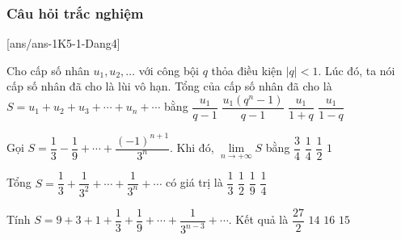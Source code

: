 \subsubsection{Câu hỏi trắc nghiệm}
[ans/ans-1K5-1-Dang4]
\begin{ex}%
	Cho cấp số nhân $u_1,u_2,\ldots$ với công bội $q$ thỏa điều kiện $|q|<1$. Lúc đó, ta nói cấp số nhân đã cho là lùi vô hạn. Tổng của cấp số nhân đã cho là $S=u_1+u_2+u_3+\cdots +u_n+\cdots$ bằng 
	\choice
	{$\dfrac{u_1}{q-1}$}
	{$\dfrac{u_1\left(q^n-1\right)}{q-1}$}
	{$\dfrac{u_1}{1+q}$}
	{\True $\dfrac{u_1}{1-q}$}
\end{ex}
\begin{ex}%
	Gọi $S=\dfrac{1}{3}-\dfrac{1}{9}+\cdots +\dfrac{(-1)^{n+1}}{3^n}$. Khi đó, $\lim \limits_{n \to +\infty}S$ bằng 
	\choice
	{$\dfrac{3}{4}$}
	{\True $\dfrac{1}{4}$}
	{$\dfrac{1}{2}$}
	{$1$}
\end{ex}
\begin{ex}%
	Tổng $S=\dfrac{1}{3}+\dfrac{1}{3^2}+\cdots +\dfrac{1}{3^n}+\cdots$ có giá trị là 
	\choice
	{$\dfrac{1}{3}$}
	{\True $\dfrac{1}{2}$}
	{$\dfrac{1}{9}$}
	{$\dfrac{1}{4}$}
\end{ex}
\begin{ex}%
	Tính $S=9+3+1+\dfrac{1}{3}+\dfrac{1}{9}+\cdots +\dfrac{1}{3^{n-3}}+\cdots$. Kết quả là 
	\choice
	{\True $\dfrac{27}{2}$}
	{$14$}
	{$16$}
	{$15$}
\end{ex}
